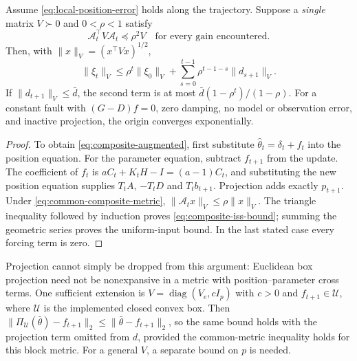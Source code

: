 \begin{proposition}
\label{prop:composite-iss}
Assume \eqref{eq:local-position-error} holds along the trajectory. Suppose a
\emph{single} matrix $V\succ0$ and $0<\rho<1$ satisfy
\begin{equation}\label{eq:common-composite-metric}
\mathcal A_t^\top V\mathcal A_t\preceq\rho^2 V
\quad\text{for every gain encountered.}
\end{equation}
Then, with $\|x\|_V=(x^\top Vx)^{1/2}$,
\begin{equation}\label{eq:composite-iss-bound}
\|\xi_t\|_V
\le \rho^t\|\xi_0\|_V+
\sum_{s=0}^{t-1}\rho^{t-1-s}\|d_{s+1}\|_V.
\end{equation}
If $\|d_{t+1}\|_V\le\bar d$, the second term is at most
$\bar d(1-\rho^t)/(1-\rho)$. For a constant fault with $(G-D)f=0$,
zero damping, no model or observation error, and inactive projection, the
origin converges exponentially.
\end{proposition}
\begin{proof}
To obtain \eqref{eq:composite-augmented}, first substitute
$\hat\theta_t=\delta_t+f_t$ into the position equation. For the parameter equation,
subtract $f_{t+1}$ from the update. The coefficient of $f_t$ is
$aC_t+K_tH-I=(a-1)C_t$, and substituting the new position equation supplies
$T_tA$, $-T_tD$ and $T_tb_{t+1}$. Projection adds exactly $p_{t+1}$.
Under \eqref{eq:common-composite-metric},
$\|\mathcal A_t x\|_V\le\rho\|x\|_V$. The triangle inequality followed by
induction proves \eqref{eq:composite-iss-bound}; summing the geometric series
proves the uniform-input bound. In the last stated case every forcing term is
zero.
\end{proof}

Projection cannot simply be dropped from this argument: Euclidean box projection
need not be nonexpansive in a metric with position--parameter cross terms.
One sufficient extension is $V=\operatorname{diag}(V_e,cI_p)$ with $c>0$ and
$f_{t+1}\in\mathcal U$, where $\mathcal U$ is the implemented closed convex box.
Then
$\|\Pi_{\mathcal U}(\bar\theta)-f_{t+1}\|_2
\le\|\bar\theta-f_{t+1}\|_2$, so the same bound holds with the projection term
omitted from $d$, provided the common-metric inequality holds for this block
metric. For a general $V$, a separate bound on $p$ is needed.

